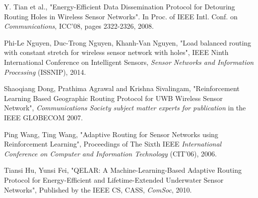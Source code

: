 \documentclass[12pt]{report}
\begin{document}
\begin{thebibliography}{100}
Y. Tian et al., "Energy-Efficient Data Dissemination Protocol for Detouring Routing Holes in Wireless Sensor Networks". In Proc. of IEEE Intl. Conf. on \textit{Communications}, ICC'08, pages 2322-2326, 2008.

Phi-Le Nguyen, Duc-Trong Nguyen, Khanh-Van Nguyen, "Load balanced routing with constant stretch for wireless sensor network with holes", IEEE Ninth International Conference on Intelligent Sensors, \textit{Sensor Networks and Information Processing} (ISSNIP), 2014.

Shaoqiang Dong, Prathima Agrawal and Krishna Sivalingam, "Reinforcement Learning Based Geographic Routing Protocol
for UWB Wireless Sensor Network", \textit{Communications Society subject matter experts for publication} in the IEEE GLOBECOM 2007.

Ping Wang, Ting Wang, "Adaptive Routing for Sensor Networks using Reinforcement Learning", Proceedings of The Sixth IEEE \textit{International Conference on Computer and Information Technology} (CIT'06), 2006.

Tiansi Hu, Yunsi Fei, "QELAR: A Machine-Learning-Based Adaptive Routing Protocol for Energy-Efficient and Lifetime-Extended Underwater Sensor Networks", Published by the IEEE CS, CASS, \textit{ComSoc}, 2010.
\end{thebibliography}
\end{document}
